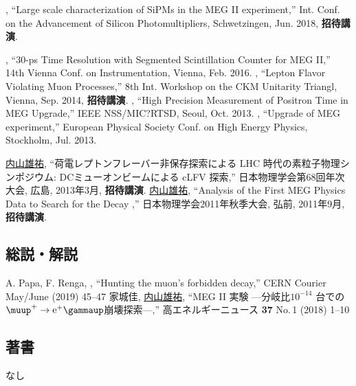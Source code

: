 \begin{enumerate}

 	 \me, ``Large scale characterization of SiPMs in the MEG II experiment,''
  	Int. Conf. on the Advancement of Silicon Photomultipliers, Schwetzingen, Jun. 2018, \textbf{招待講演}.

 	 \me, ``30-ps Time Resolution with Segmented Scintillation Counter for MEG II,''
  	14th Vienna Conf. on Instrumentation, Vienna, Feb. 2016.
 	 \me, ``Lepton Flavor Violating Muon Processes,''
  	8th Int. Workshop on the CKM Unitarity Triangl, Vienna, Sep. 2014, \textbf{招待講演}.
 	 \me, ``High Precision Measurement of Positron Time in MEG Upgrade,''
  	IEEE NSS/MIC?RTSD, Seoul, Oct. 2013.
 	 \me, ``Upgrade of MEG experiment,''
  	European Physical Society Conf. on High Energy Physics, Stockholm, Jul. 2013.


  	\underline{内山雄祐},  	``荷電レプトンフレーバー非保存探索による LHC 時代の素粒子物理シンポジウム: DCミューオンビームによる cLFV 探索,''
  	日本物理学会第68回年次大会,  広島,  2013年3月, \textbf{招待講演}.
  	\underline{内山雄祐},  	``Analysis of the First MEG Physics Data to Search for the Decay \megc,''
  	日本物理学会2011年秋季大会,  弘前,  2011年9月, \textbf{招待講演}.


\end{enumerate}

\subsection{総説・解説}
\begin{enumerate}
\setcounter{enumi}{59}
	\setlength{\itemsep}{-1pt}
  A. Papa, F. Renga, \me,
  ``Hunting the muon's forbidden decay,''
  CERN Courier May/June (2019) 45--47
  家城佳, \underline{内山雄祐},
  ``MEG II 実験 ---分岐比$10^{-14}$ 台での$\megc$崩壊探索---,''
  高エネルギーニュース {\bf 37} No.\,1 (2018) 1--10
\end{enumerate}

\vspace{-8mm}
\subsection{著書}
\vspace{-3mm}
なし
\vspace{-8mm}
